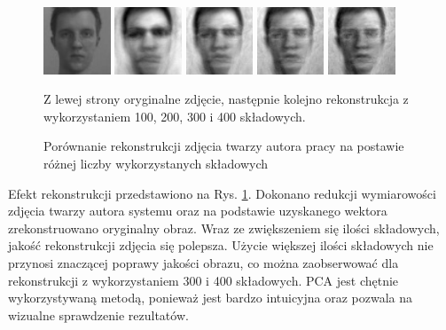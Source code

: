 \documentclass[oneside, eng]{mgr}
\begin{document}
\begin{figure}
\centering
	\parbox{2cm}{
		\includegraphics[width=2cm]{img/face_1.jpg}
		}
		\qquad
		\begin{minipage}{2cm}
			\includegraphics[width=2cm]{img/100.jpg}
		\end{minipage}
		\begin{minipage}{2cm}
			\includegraphics[width=2cm]{img/200.jpg}
		\end{minipage}
		\begin{minipage}{2cm}
			\includegraphics[width=2cm]{img/300.jpg}
		\end{minipage}
		\begin{minipage}{2cm}
			\includegraphics[width=2cm]{img/400.jpg}
		\end{minipage}
	\caption{Porównanie rekonstrukcji zdjęcia twarzy autora pracy na postawie różnej liczby wykorzystanych składowych} 
	Z lewej strony oryginalne zdjęcie, następnie kolejno rekonstrukcja z wykorzystaniem 100, 200, 300 i 400 składowych.
	\label{fig:rekonstrukcja}
\end{figure}

Efekt rekonstrukcji przedstawiono na Rys. \ref{fig:rekonstrukcja}. Dokonano redukcji wymiarowości zdjęcia twarzy autora systemu oraz na podstawie uzyskanego wektora zrekonstruowano oryginalny obraz. Wraz ze zwiększeniem się ilości składowych, jakość rekonstrukcji zdjęcia się polepsza. Użycie większej ilości składowych nie przynosi znaczącej poprawy jakości obrazu, co można zaobserwować dla rekonstrukcji z wykorzystaniem 300 i 400 składowych. PCA jest chętnie wykorzystywaną metodą, ponieważ jest bardzo intuicyjna oraz pozwala na wizualne sprawdzenie rezultatów.
\end{document}
